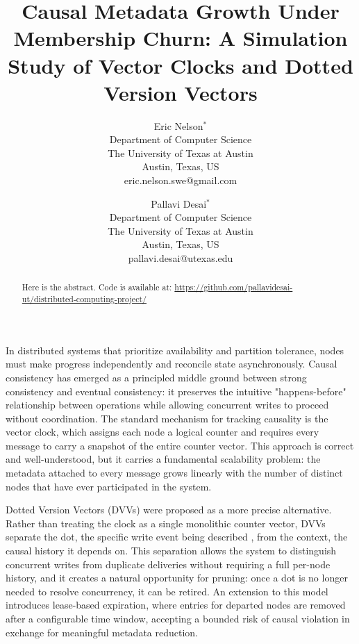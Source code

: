 \documentclass[times, 10pt,twocolumn]{article}
\begin{document}
\title{Causal Metadata Growth Under Membership Churn: A Simulation Study of Vector Clocks and Dotted Version Vectors}

\author{
Eric Nelson$^{*}$ \\
Department of Computer Science\\
The University of Texas at Austin \\
Austin, Texas, US \\
eric.nelson.swe@gmail.com
\and
Pallavi Desai$^{*}$ \\
Department of Computer Science\\
The University of Texas at Austin \\
Austin, Texas, US \\
pallavi.desai@utexas.edu
}
\maketitle
\thispagestyle{empty}
\begingroup
\renewcommand\thefootnote{*}
\endgroup

\begin{abstract}
  Here is the abstract. 
  Code is available at: \url{https://github.com/pallavidesai-ut/distributed-computing-project/}
\end{abstract}
\vspace{-2em}
\vspace{-1em}

In distributed systems that prioritize availability and partition tolerance, nodes must make progress independently and reconcile state asynchronously. Causal consistency has emerged as a principled middle ground between strong consistency and eventual consistency: it preserves the intuitive "happens-before" relationship between operations while allowing concurrent writes to proceed without coordination. The standard mechanism for tracking causality is the vector clock, which assigns each node a logical counter and requires every message to carry a snapshot of the entire counter vector. This approach is correct and well-understood, but it carries a fundamental scalability problem: the metadata attached to every message grows linearly with the number of distinct nodes that have ever participated in the system.

Dotted Version Vectors (DVVs) were proposed as a more precise alternative. Rather than treating the clock as a single monolithic counter vector, DVVs separate the dot, the specific write event being described , from the context, the causal history it depends on. This separation allows the system to distinguish concurrent writes from duplicate deliveries without requiring a full per-node history, and it creates a natural opportunity for pruning: once a dot is no longer needed to resolve concurrency, it can be retired. An extension to this model introduces lease-based expiration, where entries for departed nodes are removed after a configurable time window, accepting a bounded risk of causal violation in exchange for meaningful metadata reduction.
\end{document}
